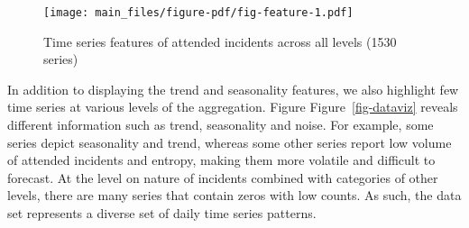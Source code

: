 \documentclass[
  authoryear,
  preprint,
  3p]{elsarticle}
\begin{document}
\begin{figure}

{\centering \texttt{[image: main\_files/figure-pdf/fig-feature-1.pdf]}

}

\caption{\label{fig-feature}Time series features of attended incidents
across all levels (1530 series)}

\end{figure}

In addition to displaying the trend and seasonality features, we also
highlight few time series at various levels of the aggregation. Figure
Figure~\ref{fig-dataviz} reveals different information such as trend,
seasonality and noise. For example, some series depict seasonality and
trend, whereas some other series report low volume of attended incidents
and entropy, making them more volatile and difficult to forecast. At the
level on nature of incidents combined with categories of other levels,
there are many series that contain zeros with low counts. As such, the
data set represents a diverse set of daily time series patterns.
\end{document}
